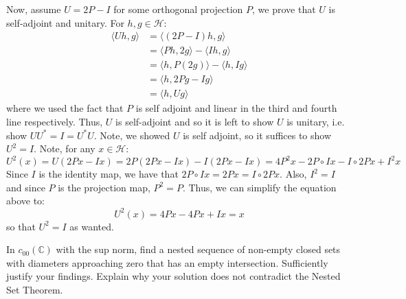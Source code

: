 \documentclass{article}
\begin{document}
\begin{Answer}
        Now, assume $U = 2P-I$ for some orthogonal projection $P$, we prove that $U$ is self-adjoint and unitary. For $h,g\in\mathscr{H}$:
        \begin{align*}
            \langle Uh, g\rangle &= \langle (2P-I)h, g\rangle \\
                &= \langle Ph, 2g\rangle - \langle Ih,g\rangle \\
                &= \langle h,P(2g)\rangle - \langle h,Ig\rangle \\
                &= \langle h,2Pg - Ig\rangle \\
                &= \langle h,Ug\rangle 
        \end{align*}
        where we used the fact that $P$ is self adjoint and linear in the third and fourth line respectively. Thus, $U$ is self-adjoint and
        so it is left to show $U$ is unitary, i.e. show $UU^* = I = U^*U$. Note, we showed $U$ is self adjoint, so it suffices to show
        $U^2 = I$. Note, for any $x\in\mathscr{H}$:
        \[ U^2(x) = U(2Px - Ix) = 2P(2Px - Ix) - I(2Px - Ix) = 4P^2x - 2P\circ Ix - I\circ 2Px + I^2x \]
        Since $I$ is the identity map, we have that $2P\circ Ix = 2Px = I\circ 2Px$. Also, $I^2 = I$ and since $P$ is the projection map,
        $P^2 = P$. Thus, we can simplify the equation above to:
        \[ U^2(x) = 4Px - 4Px + Ix = x \]
        so that $U^2 = I$ as wanted.
    \end{Answer}

    \newpage
    \begin{Exercise}
        In $c_{00}(\mathbb{C})$ with the sup norm, find a nested sequence of non-empty closed sets with diameters approaching zero that has
        an empty intersection. Sufficiently justify your findings. Explain why your solution does not contradict the Nested Set Theorem.
    \end{Exercise}
\end{document}
